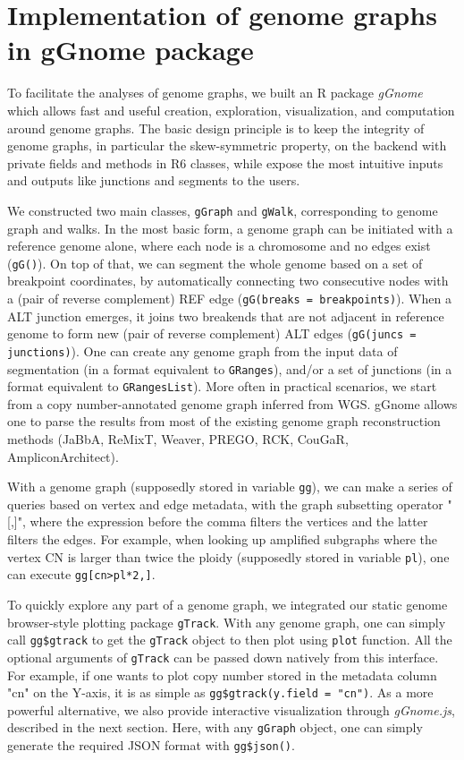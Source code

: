 \documentclass[phd,tocprelim]{cornell}
\begin{document}
\section{Implementation of genome graphs in gGnome package} \label{sec:implement_ggnome}
To facilitate the analyses of genome graphs, we built an R package \textit{gGnome} which allows fast and useful creation, exploration, visualization, and computation around genome graphs. The basic design principle is to keep the integrity of genome graphs, in particular the skew-symmetric property, on the backend with private fields and methods in R6 classes, while expose the most intuitive inputs and outputs like junctions and segments to the users.

We constructed two main classes, \texttt{gGraph} and \texttt{gWalk}, corresponding to genome graph and walks. In the most basic form, a genome graph can be initiated with a reference genome alone, where each node is a chromosome and no edges exist (\texttt{gG()}). On top of that, we can segment the whole genome based on a set of breakpoint coordinates, by automatically connecting two consecutive nodes with a (pair of reverse complement) REF edge (\texttt{gG(breaks = breakpoints)}). When a ALT junction emerges, it joins two breakends that are not adjacent in reference genome to form new (pair of reverse complement) ALT edges (\texttt{gG(juncs = junctions)}). One can create any genome graph from the input data of segmentation (in a format equivalent to \texttt{GRanges}), and/or a set of junctions (in a format equivalent to \texttt{GRangesList}). More often in practical scenarios, we start from a copy number-annotated genome graph inferred from WGS. gGnome allows one to parse the results from most of the existing genome graph reconstruction methods (JaBbA, ReMixT, Weaver, PREGO, RCK, CouGaR, AmpliconArchitect).


With a genome graph (supposedly stored in variable \texttt{gg}), we can make a series of queries based on vertex and edge metadata, with the graph subsetting operator "[,]", where the expression before the comma filters the vertices and the latter filters the edges. For example, when looking up amplified subgraphs where the vertex CN is larger than twice the ploidy (supposedly stored in variable \texttt{pl}), one can execute \texttt{gg[cn>pl*2,]}. 

To quickly explore any part of a genome graph, we integrated our static genome browser-style plotting package \texttt{gTrack}. With any genome graph, one can simply call \texttt{gg\$gtrack} to get the \texttt{gTrack} object to then plot using \texttt{plot} function. All the optional arguments of \texttt{gTrack} can be passed down natively from this interface. For example, if one wants to plot copy number stored in the metadata column "cn" on the Y-axis, it is as simple as \texttt{gg\$gtrack(y.field = "cn")}. As a more powerful alternative, we also provide interactive visualization through \textit{gGnome.js}, described in the next section. Here, with any \texttt{gGraph} object, one can simply generate the required JSON format with \texttt{gg\$json()}.
\end{document}
